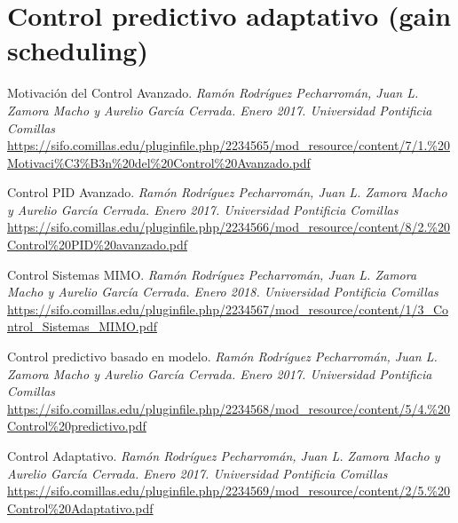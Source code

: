 \newpage
\section{Control predictivo adaptativo (gain scheduling)}


\newpage %
\begin{references}
	Motivación del Control Avanzado.
	\textit{Ramón Rodríguez Pecharromán, Juan L. Zamora Macho y Aurelio García Cerrada. Enero 2017. Universidad Pontificia Comillas} \\
	\url{https://sifo.comillas.edu/pluginfile.php/2234565/mod_resource/content/7/1.\%20Motivaci\%C3\%B3n\%20del\%20Control\%20Avanzado.pdf}

	Control PID Avanzado.
	\textit{Ramón Rodríguez Pecharromán, Juan L. Zamora Macho y Aurelio García Cerrada. Enero 2017. Universidad Pontificia Comillas} \\
	\url{https://sifo.comillas.edu/pluginfile.php/2234566/mod_resource/content/8/2.\%20Control\%20PID\%20avanzado.pdf}

	Control Sistemas MIMO.
	\textit{Ramón Rodríguez Pecharromán, Juan L. Zamora Macho y Aurelio García Cerrada. Enero 2018. Universidad Pontificia Comillas} \\
	\url{https://sifo.comillas.edu/pluginfile.php/2234567/mod_resource/content/1/3_Control_Sistemas_MIMO.pdf}
	
	Control predictivo basado en modelo.
	\textit{Ramón Rodríguez Pecharromán, Juan L. Zamora Macho y Aurelio García Cerrada. Enero 2017. Universidad Pontificia Comillas} \\
	\url{https://sifo.comillas.edu/pluginfile.php/2234568/mod_resource/content/5/4.\%20Control\%20predictivo.pdf}
	
	Control Adaptativo.
	\textit{Ramón Rodríguez Pecharromán, Juan L. Zamora Macho y Aurelio García Cerrada. Enero 2017. Universidad Pontificia Comillas} \\
	\url{https://sifo.comillas.edu/pluginfile.php/2234569/mod_resource/content/2/5.\%20Control\%20Adaptativo.pdf}
	

	
\end{references}


